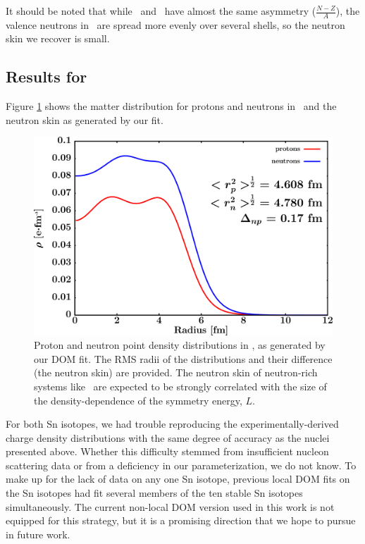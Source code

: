 It should be noted that while \snTwelve\ and \oEight\ have almost the same asymmetry
($\frac{N-Z}{A}$), the valence neutrons in \snTwelve\ are spread more evenly over several
shells, so the neutron skin we recover is small.

\subsection{Results for \snFour}
Figure \ref{Sn124MatterDistribution} shows the matter distribution for protons and neutrons in
\snFour\ and the neutron skin as generated by our fit.
\begin{figure}[tb]
    \centering
    \includegraphics[width=\textwidth]{figures/sn124_matterDensity.png}
    \caption[Proton and neutron matter density distributions in \snFour]
    {
        Proton and neutron point density distributions in \snFour, as
        generated by our DOM fit. The RMS radii of the distributions and their
        difference (the neutron skin) are provided. The neutron skin of
        neutron-rich systems like \snFour\ are expected to be strongly correlated
        with the size of the density-dependence of the symmetry energy, $L$.
    }
    \label{Sn124MatterDistribution}
\end{figure}
For both Sn isotopes, we had trouble
reproducing the experimentally-derived charge density distributions with
the same degree of accuracy as the nuclei presented above.
Whether this difficulty stemmed from insufficient nucleon scattering
data or from a deficiency in our parameterization, we do not know. To make up for the lack of data
on any one Sn isotope, previous local DOM fits on the Sn isotopes \cite{Charity2006, Mueller2011}
had fit several members of the ten stable Sn isotopes simultaneously.
The current non-local DOM version used in this work is not equipped for this strategy, but it is a
promising direction that we hope to pursue in future work.

